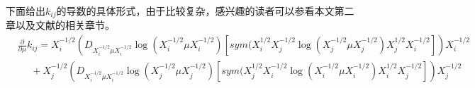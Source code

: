 下面给出$k_{ij}$的导数的具体形式，由于比较复杂，感兴趣的读者可以参看本文第二章以及文献\cite{Maniopt_DiscreteCurveFitting,Statistics_SLEDML}的相关章节。
\begin{equation}
\label{kernel_elementwise_gradient}
\begin{split}
&\frac{\partial}{\partial \mu}k_{ij}=X_{i}^{-1/2}\left(D_{X_{i}^{-1/2}\mu X_{i}^{-1/2}}\log(X_{i}^{-1/2}\mu X_{i}^{-1/2})[sym(X_{i}^{1/2}X_{j}^{-1/2}\log(X_{j}^{-1/2}\mu X_{j}^{-1/2})X_{j}^{1/2}X_{i}^{-1/2}]\right)X_{i}^{-1/2}\\
&~~~~~~+X_{j}^{-1/2}\left(D_{X_{i}^{-1/2}\mu X_{i}^{-1/2}}\log(X_{j}^{-1/2}\mu X_{j}^{-1/2})[sym(X_{j}^{1/2}X_{i}^{-1/2}\log(X_{i}^{-1/2}\mu X_{i}^{-1/2})X_{i}^{1/2}X_{j}^{-1/2}]\right)X_{j}^{-1/2}\\
\end{split}
\end{equation}

